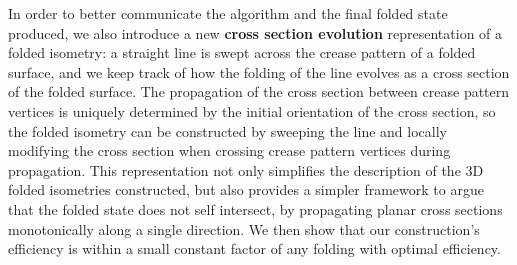 In order to better communicate the algorithm and the final folded state
produced, we also introduce a new {\bf cross section evolution} representation
of a folded isometry: a straight line is swept across the crease pattern of a
folded surface, and we keep track of how the folding of the line evolves as a
cross section of the folded surface. The propagation of the cross section
between crease pattern vertices is uniquely determined by the initial
orientation of the cross section, so the folded isometry can be constructed by
sweeping the line and locally modifying the cross section when crossing crease
pattern vertices during propagation. This representation not only simplifies the
description of the 3D folded isometries constructed, but also provides a simpler
framework to argue that the folded state does not self intersect, by propagating
planar cross sections monotonically along a single direction. We then
show that our construction's efficiency is within a small constant factor of
any folding with optimal efficiency.
